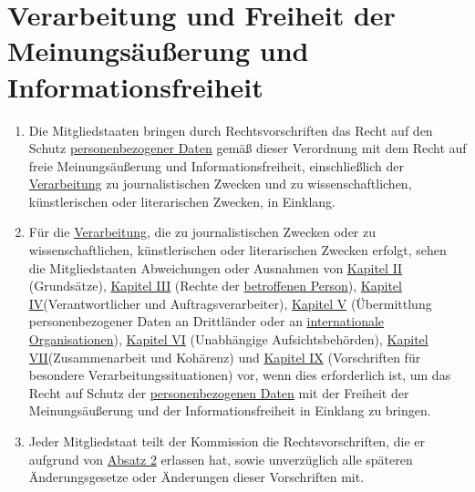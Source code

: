 \chapter{Verarbeitung und Freiheit der Meinungsäußerung und Informationsfreiheit}
\label{ch:85}


\begin{enumerate}

  \item Die Mitgliedstaaten bringen durch Rechtsvorschriften das Recht auf den Schutz \hyperref[itm:04-1]{personenbezogener Daten} gemäß
   dieser Verordnung mit dem Recht auf freie Meinungsäußerung und Informationsfreiheit, einschließlich der \hyperref[itm:04-2]{Verarbeitung}
   zu journalistischen Zwecken und zu wissenschaftlichen, künstlerischen oder literarischen Zwecken, in Einklang.
  \label{itm:85-1}

  \item Für die \hyperref[itm:04-2]{Verarbeitung}, die zu journalistischen Zwecken oder zu wissenschaftlichen, künstlerischen oder
   literarischen Zwecken erfolgt, sehen die Mitgliedstaaten Abweichungen oder Ausnahmen von \hyperref[part:2]
   {Kapitel II} (Grundsätze), \hyperref[part:3]{Kapitel III} (Rechte der \hyperref[itm:04-1]{betroffenen Person}), \hyperref[part:4]
   {Kapitel IV}(Verantwortlicher und Auftragsverarbeiter), \hyperref[part:5]{Kapitel V} (Übermittlung personenbezogener
   Daten an Drittländer oder an \hyperref[itm:04-29]{internationale Organisationen}), \hyperref[part:6]{Kapitel VI}
   (Unabhängige Aufsichtsbehörden), \hyperref[part:7]{Kapitel VII}(Zusammenarbeit und Kohärenz) und \hyperref[part:9]
   {Kapitel IX} (Vorschriften für besondere Verarbeitungssituationen) vor, wenn dies erforderlich ist, um das Recht auf
   Schutz der \hyperref[itm:04-1]{personenbezogenen Daten} mit der Freiheit der Meinungsäußerung und der Informationsfreiheit in Einklang zu
   bringen.
  \label{itm:85-2}

  \item Jeder Mitgliedstaat teilt der Kommission die Rechtsvorschriften, die er aufgrund von \hyperref[itm:85-2]
   {Absatz 2} erlassen hat, sowie unverzüglich alle späteren Änderungsgesetze oder Änderungen dieser Vorschriften mit.
  \label{itm:85-3}

\end{enumerate}


